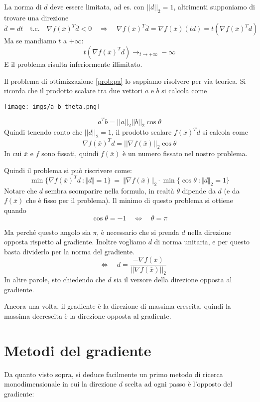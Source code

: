 \begin{notes} La norma di $d$ deve essere limitata, ad es. con
$||d||_2 = 1$, altrimenti supponiamo di trovare una direzione
$$ \overline{d} = dt \quad \text{t.c.} \quad \nabla f(\overline{x})^{T} \overline{d} < 0 \quad \Longrightarrow \quad\nabla f(\overline{x})^{T} \overline{d} = \nabla f(\overline{x})(td) = t(\nabla f(\overline{x})^{T}d)$$
Ma se mandiamo $t$ a $+\infty$:
$$t(\nabla f(\overline{x})^{T}d) \longrightarrow_{t \to +\infty} - \infty$$
E il problema risulta inferiormente illimitato.
\end{notes}

Il problema di ottimizzazione \ref{prob:pa} lo sappiamo risolvere per
via teorica. Si ricorda che il prodotto scalare tra due vettori $a$ e
$b$ si calcola come

\centerline{\texttt{[image: imgs/a-b-theta.png]}}

$$a^{T}b = ||a||_{2} ||b||_2 \cos \theta$$
Quindi tenendo conto che $||d||_2 = 1$, il prodotto scalare
$f(\overline{x})^{T}d$ si calcola come
$$\nabla f(\overline{x})^{T} d =  || \nabla f(\overline{x})||_{2} \cos \theta$$
In cui $\overline{x}$ e $f$ sono fissati, quindi $f(\overline{x})$ \`e
un numero fissato nel nostro problema.

Quindi il problema si può riscrivere come:
$$ \min \{ \nabla f(\overline{x})^{T}d ~ : \Vert d \Vert = 1 \} ~ =  ~ \Vert\nabla f(\overline{x})\Vert_{2} \cdot \min\{ \cos \theta ~ : \Vert d \Vert_{2}=1 \}$$
Notare che $d$ sembra scomparire nella formula, in realt\`a $\theta$
dipende da $d$ (e da $f(\overline{x})$ che \`e fisso per il problema).
Il minimo di questo problema si ottiene quando
$$ \cos \theta = -1 \quad \Longleftrightarrow \quad  \theta = \pi $$

Ma perch\'e questo angolo sia $\pi$, \`e necessario che si prenda $d$
nella direzione opposta rispetto al gradiente. Inoltre vogliamo $d$ di
norma unitaria, e per questo basta dividerlo per la norma del
gradiente.
$$\quad \Longleftrightarrow \quad d = \frac{- \nabla f(\overline{x})}{|| \nabla f(\overline{x})||_{2}}$$
In altre parole, sto chiedendo che $d$ sia il versore della direzione
opposta al gradiente.

Ancora una volta, il gradiente \`e la direzione di massima crescita,
quindi la massima decrescita \`e la direzione opposta al gradiente.

\section{Metodi del gradiente} Da quanto visto sopra, si deduce
facilmente un primo metodo di ricerca monodimensionale in cui la
direzione $d$ scelta ad ogni passo \`e l'opposto del gradiente:

